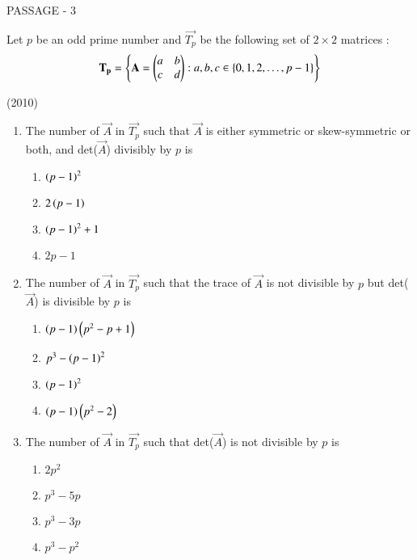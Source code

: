 \documentclass[journal,12pt,onecolumn]{IEEEtran}
\theoremstyle{remark}
\begin{document}
\begin{multicols}{2}
	\bigskip

	{\centering PASSAGE - 3 \par}

	\bigskip

	Let $p$ be an odd prime number and $\vec{T_p}$ be the following set of $2\times2$ matrices :
	$$\mathbf{T_p}=\left\{\mathbf{A}=\begin{pmatrix}a & b \\ c & d\end{pmatrix}:a,b,c\in\left\{0,1,2,\dots,p-1\right\}\right\}$$

			\hfill(2010)
	
	\begin{enumerate}
		\item The number of $\vec{A}$ in $\vec{T_p}$ such that $\vec{A}$ is either symmetric or skew-symmetric or both, and det($\vec{A}$) divisibly by $p$ is
			\begin{enumerate}
				\item $\left(p-1\right)^2$
				\item $2\left(p-1\right)$
				\item $\left(p-1\right)^2+1$
				\item $2p-1$
			\end{enumerate}


		\item The number of $\vec{A}$ in $\vec{T_p}$ such that the trace of $\vec{A}$ is not divisible by $p$ but det($\vec{A}$) is divisible by $p$ is

			
			\begin{enumerate}
				\item $\left(p-1\right)\left(p^2-p+1\right)$
				\item $p^3-\left(p-1\right)^2$
				\item $\left(p-1\right)^2$
				\item $\left(p-1\right)\left(p^2-2\right)$
			\end{enumerate}

		\item The number of $\vec{A}$ in $\vec{T_p}$ such that det($\vec{A}$) is not divisible by $p$ is 
			\begin{enumerate}
				\item $2p^2$
				\item $p^3-5p$
				\item $p^3-3p$
				\item $p^3-p^2$
			\end{enumerate}

	\end{enumerate}

\end{multicols}
\end{document}
